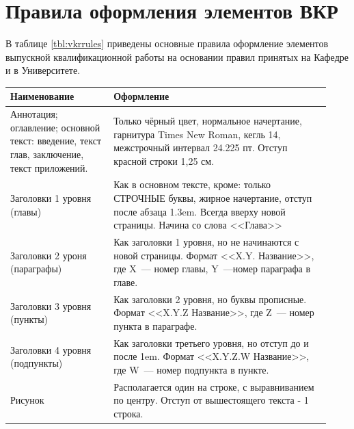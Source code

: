 \section{Правила оформления элементов ВКР}\label{sec:appA}

В таблице \ref{tbl:vkrrules} приведены основные правила оформление элементов выпускной квалификационной работы на основании правил принятых на Кафедре и в Университете.

\begin{VKRlongtable}
		\caption{Правила оформления элементов ВКР}
		\label{tbl:vkrrules}
		\begin{longtable}
		{| >{\raggedright}p{0.3\linewidth} | >{\raggedright\arraybackslash} p{0.63\linewidth}  |  }
		\hline
		\centering\bfseries Наименование & 
		\centering\bfseries\arraybackslash Оформление \\ \hline  				
		Аннотация;
		оглавление;
		основной текст: введение, текст глав, заключение, текст приложений. 
		& 
		Только чёрный цвет, нормальное начертание, гарнитура Times New Roman, кегль 14, межстрочный интервал 24.225 пт. Отступ красной строки 1,25 см.   
		
		\\ \hline
		
		Заголовки 1 уровня (главы) 
		& 
		Как в основном тексте, кроме: только СТРОЧНЫЕ буквы, жирное начертание, отступ после абзаца 1.3em. Всегда вверху новой страницы. Начина со слова <<Глава>>  
		
		\\ \hline 
		Заголовки 2 уроня (параграфы) 
		& 
		Как заголовки 1 уровня, но не начинаются с новой страницы. Формат <<X.Y. Название>>, где X~--- номер главы, Y~---номер параграфа в главе.
		
		\\ \hline 	
		
		Заголовки 3 уровня (пункты)
		& 
		Как заголовки 2 уровня, но буквы прописные. Формат <<X.Y.Z Название>>, где Z~--- номер пункта в параграфе.
		
		\\ \hline 
		
		Заголовки 4	уровня (подпункты)
		&
		Как заголовки третьего уровня, но отступ до и после 1em. Формат <<X.Y.Z.W Название>>, где W~--- номер подпункта в пункте.
		
		\\ \hline 
		
		Рисунок 
		& 
		Располагается один на строке, с выравниванием по центру. Отступ от вышестоящего текста - 1 строка.
		

\end{longtable}
\end{VKRlongtable}
